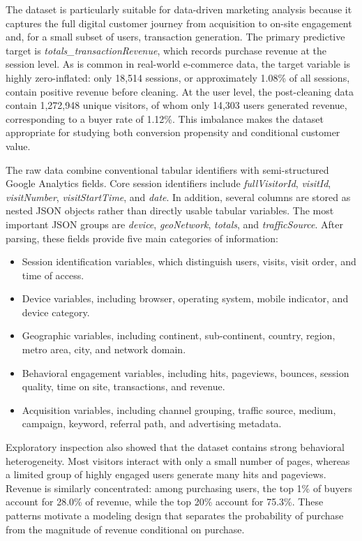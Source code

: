 \documentclass[conference]{IEEEtran}
\begin{document}
The dataset is particularly suitable for data-driven marketing analysis because it captures the full digital customer journey from acquisition to on-site engagement and, for a small subset of users, transaction generation. The primary predictive target is \textit{totals\_transactionRevenue}, which records purchase revenue at the session level. As is common in real-world e-commerce data, the target variable is highly zero-inflated: only 18,514 sessions, or approximately 1.08\% of all sessions, contain positive revenue before cleaning. At the user level, the post-cleaning data contain 1,272,948 unique visitors, of whom only 14,303 users generated revenue, corresponding to a buyer rate of 1.12\%. This imbalance makes the dataset appropriate for studying both conversion propensity and conditional customer value.

The raw data combine conventional tabular identifiers with semi-structured Google Analytics fields. Core session identifiers include \textit{fullVisitorId}, \textit{visitId}, \textit{visitNumber}, \textit{visitStartTime}, and \textit{date}. In addition, several columns are stored as nested JSON objects rather than directly usable tabular variables. The most important JSON groups are \textit{device}, \textit{geoNetwork}, \textit{totals}, and \textit{trafficSource}. After parsing, these fields provide five main categories of information:

\begin{itemize}
    \item Session identification variables, which distinguish users, visits, visit order, and time of access.
    \item Device variables, including browser, operating system, mobile indicator, and device category.
    \item Geographic variables, including continent, sub-continent, country, region, metro area, city, and network domain.
    \item Behavioral engagement variables, including hits, pageviews, bounces, session quality, time on site, transactions, and revenue.
    \item Acquisition variables, including channel grouping, traffic source, medium, campaign, keyword, referral path, and advertising metadata.
\end{itemize}

Exploratory inspection also showed that the dataset contains strong behavioral heterogeneity. Most visitors interact with only a small number of pages, whereas a limited group of highly engaged users generate many hits and pageviews. Revenue is similarly concentrated: among purchasing users, the top 1\% of buyers account for 28.0\% of revenue, while the top 20\% account for 75.3\%. These patterns motivate a modeling design that separates the probability of purchase from the magnitude of revenue conditional on purchase.
\end{document}

